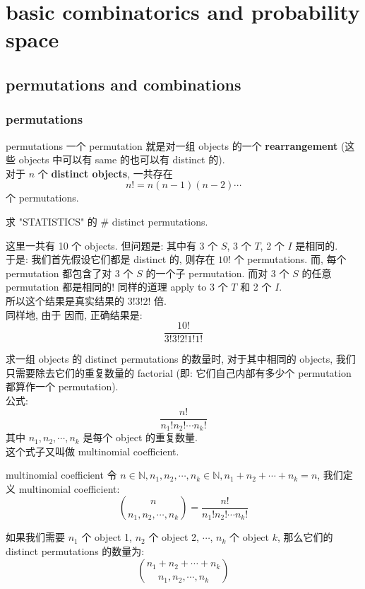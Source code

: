 \chapter{basic combinatorics and probability space}
\section{permutations and combinations}
\subsection{permutations}
\begin{definition}{permutations}
一个 permutation 就是对一组 objects 的一个 \textbf{rearrangement} (这些 objects 中可以有 same 的也可以有 distinct 的).\\
    对于 $n$ 个 \textbf{distinct objects}, 一共存在 \[n! = n(n-1)(n-2)\cdots \] 个 permutations.
\end{definition}

\begin{example}
    求 "STATISTICS" 的 \# distinct permutations.
    \begin{solution}
    这里一共有 10 个 objects. 但问题是: 其中有 3 个 \(S\), 3 个 \(T\), 2 个 \(I\) 是相同的.\\
    于是: 我们首先假设它们都是 distinct 的, 则存在 \(10!\) 个 permutations. 而, 每个 permutation 都包含了对 3 个 $S$ 的一个子 permutation. 而对 3 个 $S$ 的任意 permutation 都是相同的! 同样的道理 apply to 3 个 $T$ 和 2 个 $I$.\\
    所以这个结果是真实结果的 \(3!3!2!\) 倍.\\
    同样地, 由于
    因而, 正确结果是: \[
    \frac{10!}{3!3!2!1!1!}
    \]
    \end{solution}
\end{example}
\begin{remark}
    求一组 objects 的 distinct permutations 的数量时, 对于其中相同的 objects, 我们只需要除去它们的重复数量的 factorial (即: 它们自己内部有多少个 permutation 都算作一个 permutation).\\
    公式: \[
    \frac{n!}{n_1!n_2!\cdots n_k!}
    \]
    其中 $n_1, n_2, \cdots, n_k$ 是每个 object 的重复数量.\\
    这个式子又叫做 multinomial coefficient.
    \begin{definition}{multinomial coefficient}
    令 $n\in \mathbb{N}, n_1, n_2, \cdots, n_k\in \mathbb{N}, n_1 + n_2 + \cdots + n_k = n$, 我们定义 multinomial coefficient:
    \[
    \binom{n}{n_1, n_2, \cdots, n_k} = \frac{n!}{n_1!n_2!\cdots n_k!}
    \]
    \end{definition}

    \begin{proposition}
        如果我们需要 $n_1$ 个 object 1, $n_2$ 个 object 2, $\cdots$, $n_k$ 个 object $k$, 那么它们的 distinct permutations 的数量为:
        \[
        \binom{n_1 + n_2 + \cdots + n_k}{n_1, n_2, \cdots, n_k}
        \]
    \end{proposition}
\end{remark}


